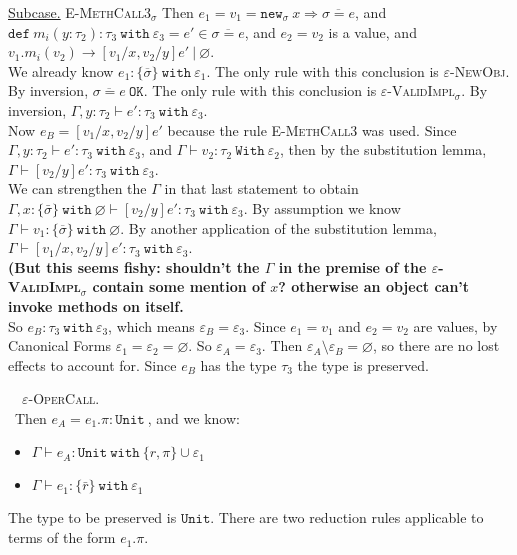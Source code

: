\documentclass{llncs}
\newcommand{\keywadj}[1]{\mathtt{#1}}
\newcommand{\keyw}[1]{\keywadj{#1}~}
\newcommand{\proofcase}[2]{
	\begin{adjustwidth}{1.5em}{0pt}
		\fbox{Case.}~~#1. \\ ~#2
	\end{adjustwidth}
}
\newcommand{\subcase}[1] {
	\begin{adjustwidth}{2.2em}{0pt}
		\underline{Subcase.} #1
	\end{adjustwidth}
}
\newcommand{\newsig}[0]{
	\keywadj{new}_\sigma~x \Rightarrow \overline{\sigma = e}
}
\begin{document}
{{		\subcase{ \textsc{E-MethCall3$_\sigma$} Then $e_1 = v_1 = \newsig$, and $\keyw{def} m_i(y : \tau_2) : \tau_3~\keyw{with} \varepsilon_3 = e' \in \overline{\sigma = e}$, and $e_2 = v_2$ is a value, and $v_1.m_i(v_2) \longrightarrow [v_1/x, v_2/y]e'~|~\varnothing$. \\
	
	\noindent	
We already know $e_1  : \{ \overline \sigma \}~ \keyw{with} \varepsilon_1$. The only rule with this conclusion is \textsc{$\varepsilon$-NewObj}. By inversion, $\overline{ \sigma = e }~\keywadj{OK}$. The only rule with this conclusion is \textsc{$\varepsilon$-ValidImpl$_{\sigma}$}. By inversion, $\Gamma, y : \tau_2 \vdash e' : \tau_3~\keyw{with} \varepsilon_3$. \\

		\noindent
Now $e_B = [v_1/x, v_2/y]e'$ because the rule \textsc{E-MethCall3} was used. Since $\Gamma, y : \tau_2 \vdash e' : \tau_3~\keyw{with} \varepsilon_3$, and $\Gamma \vdash v_2 : \tau_2~\keyw{With} \varepsilon_2$, then by the substitution lemma, $\Gamma \vdash [v_2/y]e' : \tau_3~\keyw{with} \varepsilon_3$.  \\

	\noindent
We can strengthen the $\Gamma$ in that last statement to obtain $\Gamma, x : \{ \bar \sigma \}~\keyw{with} \varnothing \vdash [v_2/y]e' : \tau_3~\keyw{with} \varepsilon_3$. By assumption we know $\Gamma \vdash v_1 : \{ \overline \sigma \}~\keyw{with} \varnothing$. By another application of the substitution lemma, $\Gamma \vdash [v_1/x, v_2/y]e' : \tau_3~\keyw{with} \varepsilon_3$. \\

	\noindent
\textbf{(But this seems fishy: shouldn't the $\Gamma$ in the premise of the \textsc{$\varepsilon$-ValidImpl$_\sigma$} contain some mention of $x$? otherwise an object can't invoke methods on itself.} \\

	\noindent
So $e_B : \tau_3~\keyw{with} \varepsilon_3$, which means $\varepsilon_B = \varepsilon_3$. Since $e_1 = v_1$ and $e_2 = v_2$ are values, by Canonical Forms $\varepsilon_1 = \varepsilon_2 = \varnothing$. So $\varepsilon_A = \varepsilon_3$. Then $\varepsilon_A \setminus \varepsilon_B = \varnothing$, so there are no lost effects to account for. Since $e_B$ has the type $\tau_3$ the type is preserved.
\\ }
}


	\proofcase{\textsc{$\varepsilon$-OperCall}} {Then $e_A = e_1.\pi : \keyw{Unit}$, and we know:
	\begin{itemize}
		\item $\Gamma \vdash e_A :  \keyw{Unit~with} \{ r, \pi \} \cup \varepsilon_1$
		\item $\Gamma \vdash e_1 : \{ \bar r \}~\keyw{with} \varepsilon_1$
	\end{itemize}
The type to be preserved is $\keywadj{Unit}$. There are two reduction rules applicable to terms of the form $e_1.\pi$. 

}}
\end{document}
